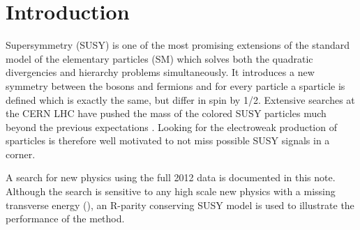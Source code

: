 \section{Introduction}
\label{sect:introduction}

Supersymmetry \cite{Martin:1997ns} (SUSY) is one of the most promising extensions of the 
standard model of the elementary particles (SM) which solves both the 
quadratic divergencies and hierarchy problems simultaneously. It introduces a new symmetry between the bosons and fermions and 
for every particle a sparticle is defined which is exactly the same, but differ in spin by 1/2. 
Extensive searches at the CERN LHC have pushed the mass of the colored SUSY particles much beyond the previous expectations \cite{susyPhyRes}. 
Looking for the electroweak production of sparticles is therefore well motivated to not miss possible SUSY signals in a corner. 


A search for new physics using the full 2012 data is documented in this note. 
Although the search is sensitive to any high scale 
new physics with a missing transverse energy (\MET), an R-parity conserving SUSY model is used 
to illustrate the performance of the method.

